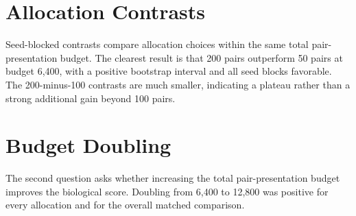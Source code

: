 ﻿\documentclass[10pt]{article}
\begin{document}
\section{Allocation Contrasts}

Seed-blocked contrasts compare allocation choices within the same total pair-presentation budget. The clearest result is that 200 pairs outperform 50 pairs at budget 6,400, with a positive bootstrap interval and all seed blocks favorable. The 200-minus-100 contrasts are much smaller, indicating a plateau rather than a strong additional gain beyond 100 pairs.

\begin{center}
\begin{minipage}{0.98\linewidth}
\centering
{}
\label{tab:allocation-contrasts}
\footnotesize
{}
\end{minipage}
\end{center}

\setlength{\parindent}{0pt}
\setlength{\parskip}{0.54em}

\section{Budget Doubling}

The second question asks whether increasing the total pair-presentation budget improves the biological score. Doubling from 6,400 to 12,800 was positive for every allocation and for the overall matched comparison.
\end{document}
